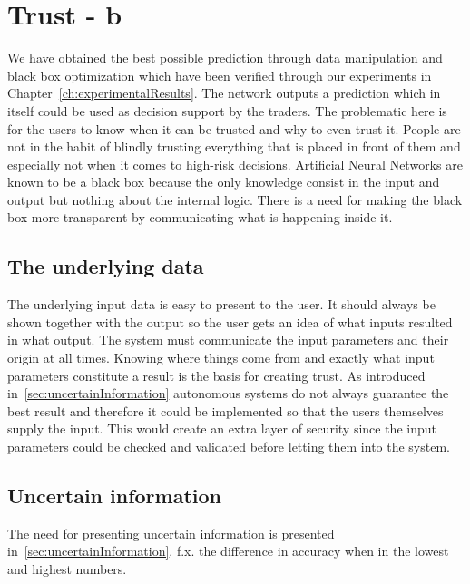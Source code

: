 \section{Trust - b}
We have obtained the best possible prediction through data manipulation and black box optimization which have been verified through our experiments in Chapter~\ref{ch:experimentalResults}. The network outputs a prediction which in itself could be used as decision support by the traders. The problematic here is for the users to know when it can be trusted and why to even trust it. People are not in the habit of blindly trusting everything that is placed in front of them and especially not when it comes to high-risk decisions. 
Artificial Neural Networks are known to be a black box \cite{fromBlackBoxToTransparentBox} because the only knowledge consist in the input and output but nothing about the internal logic. There is a need for making the black box more transparent by communicating what is happening inside it.


\subsection{The underlying data}
The underlying input data is easy to present to the user. It should always be shown together with the output so the user gets an idea of what inputs resulted in what output. The system must communicate the input parameters and their origin at all times. Knowing where things come from and exactly what input parameters constitute a result is the basis for creating trust. As introduced in~\ref{sec:uncertainInformation} autonomous systems do not always guarantee the best result and therefore it could be implemented so that the users themselves supply the input. This would create an extra layer of security since the input parameters could be checked and validated before letting them into the system. 


\subsection{Uncertain information}
The need for presenting uncertain information is presented in~\ref{sec:uncertainInformation}.
f.x. the difference in accuracy when in the lowest and highest numbers.

